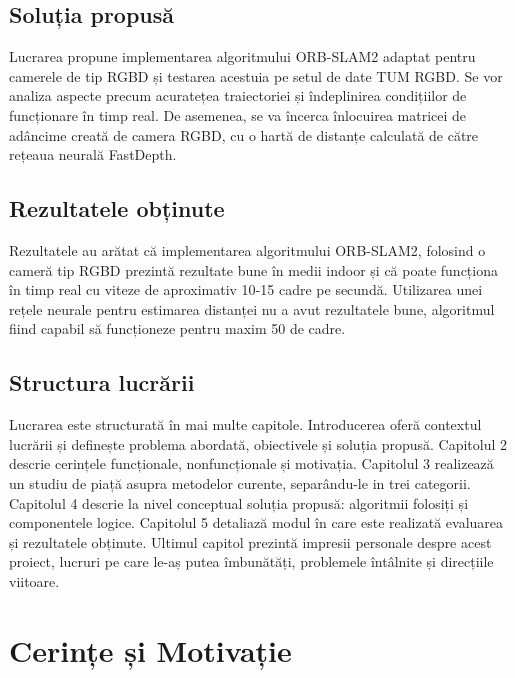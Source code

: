 \documentclass[12pt,a4paper]{report}
\begin{document}
\section{Soluția propusă}
Lucrarea propune implementarea algoritmului ORB-SLAM2 adaptat pentru camerele de tip RGBD
și testarea acestuia pe setul de date TUM RGBD\cite{tum}. Se vor analiza aspecte precum acuratețea 
traiectoriei și îndeplinirea condițiilor de funcționare în timp real. De asemenea, se va 
încerca înlocuirea matricei de adâncime creată de camera RGBD, cu o hartă de distanțe 
calculată de către rețeaua neurală FastDepth\cite{fastdepth}.  

\section{Rezultatele obținute}
Rezultatele au arătat că implementarea algoritmului ORB-SLAM2, folosind o cameră tip RGBD 
prezintă rezultate bune în medii indoor și că poate funcționa în timp real cu viteze de aproximativ
10{-}15 cadre pe secundă. Utilizarea unei rețele neurale pentru estimarea distanței nu a 
avut rezultatele bune, algoritmul fiind capabil să funcționeze pentru maxim 50 de cadre.  

\section{Structura lucrării}
Lucrarea este structurată în mai multe capitole. Introducerea oferă contextul lucrării și definește problema abordată, obiectivele și soluția propusă. Capitolul 2 descrie 
cerințele funcționale, nonfuncționale și motivația.
Capitolul 3 realizează un studiu de piață asupra metodelor curente, separându-le in trei
categorii. Capitolul 4 descrie la nivel conceptual soluția propusă: algoritmii folosiți și componentele logice.
Capitolul 5 detaliază modul în care este realizată evaluarea și rezultatele obținute.
Ultimul capitol prezintă impresii personale despre acest proiect, lucruri pe 
care le-aș putea îmbunătăți, problemele întâlnite și direcțiile viitoare. 

\chapter{Cerințe și Motivație}
\end{document}
